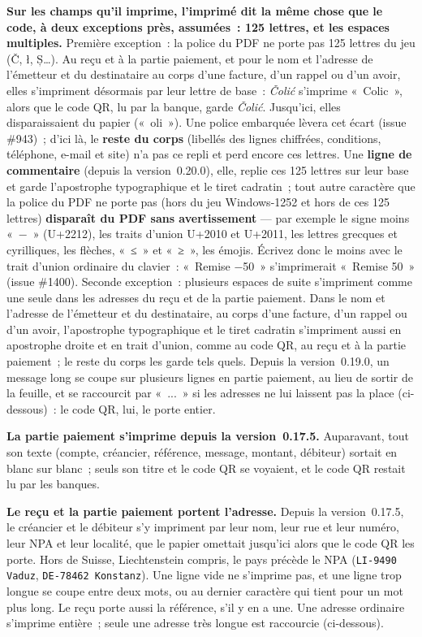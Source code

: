 \documentclass[a4paper,11pt,oneside]{article}
\begin{document}
\textbf{Sur les champs qu'il imprime, l'imprimé dit la même chose que le code, à deux exceptions près, assumées~: 125 lettres, et les espaces multiples.} Première exception~: la police du PDF ne porte pas 125 lettres du jeu (Č, ł, Ș\ldots). Au reçu et à la partie paiement, et pour le nom et l'adresse de l'émetteur et du destinataire au corps d'une facture, d'un rappel ou d'un avoir, elles s'impriment désormais par leur lettre de base~: \emph{Čolić} s'imprime «~Colic~», alors que le code QR, lu par la banque, garde \emph{Čolić}. Jusqu'ici, elles disparaissaient du papier («~oli~»). Une police embarquée lèvera cet écart (issue \#943)~; d'ici là, le \textbf{reste du corps} (libellés des lignes chiffrées, conditions, téléphone, e-mail et site) n'a pas ce repli et perd encore ces lettres. Une \textbf{ligne de commentaire} (depuis la version~0.20.0), elle, replie ces 125 lettres sur leur base et garde l'apostrophe typographique et le tiret cadratin~; tout autre caractère que la police du PDF ne porte pas (hors du jeu Windows-1252 et hors de ces 125 lettres) \textbf{disparaît du PDF sans avertissement} --- par exemple le signe moins «~−~» (U+2212), les traits d'union U+2010 et U+2011, les lettres grecques et cyrilliques, les flèches, «~≤~» et «~≥~», les émojis. Écrivez donc le moins avec le trait d'union ordinaire du clavier~: «~Remise −50~» s'imprimerait «~Remise 50~» (issue \#1400). Seconde exception~: plusieurs espaces de suite s'impriment comme une seule dans les adresses du reçu et de la partie paiement. Dans le nom et l'adresse de l'émetteur et du destinataire, au corps d'une facture, d'un rappel ou d'un avoir, l'apostrophe typographique et le tiret cadratin s'impriment aussi en apostrophe droite et en trait d'union, comme au code QR, au reçu et à la partie paiement~; le reste du corps les garde tels quels. Depuis la version~0.19.0, un message long se coupe sur plusieurs lignes en partie paiement, au lieu de sortir de la feuille, et se raccourcit par «~...~» si les adresses ne lui laissent pas la place (ci-dessous)~: le code QR, lui, le porte entier.

\textbf{La partie paiement s'imprime depuis la version~0.17.5.} Auparavant, tout son texte (compte, créancier, référence, message, montant, débiteur) sortait en blanc sur blanc~; seuls son titre et le code QR se voyaient, et le code QR restait lu par les banques.

\textbf{Le reçu et la partie paiement portent l'adresse.} Depuis la version~0.17.5, le créancier et le débiteur s'y impriment par leur nom, leur rue et leur numéro, leur NPA et leur localité, que le papier omettait jusqu'ici alors que le code QR les porte. Hors de Suisse, Liechtenstein compris, le pays précède le NPA (\texttt{LI-9490 Vaduz}, \texttt{DE-78462 Konstanz}). Une ligne vide ne s'imprime pas, et une ligne trop longue se coupe entre deux mots, ou au dernier caractère qui tient pour un mot plus long. Le reçu porte aussi la référence, s'il y en a une. Une adresse ordinaire s'imprime entière~; seule une adresse très longue est raccourcie (ci-dessous).
\end{document}
